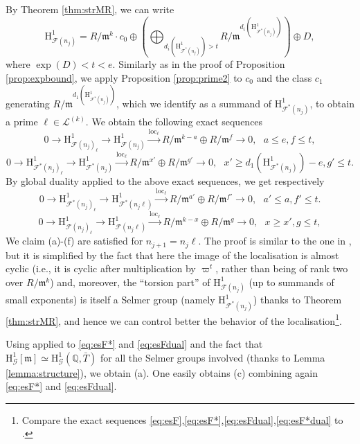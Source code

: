 \documentclass[10pt,reqno]{amsart}
\numberwithin{equation}{section}
\theoremstyle{plain}
\theoremstyle{definition}
\theoremstyle{definition}
\theoremstyle{plain}
\theoremstyle{plain}
\theoremstyle{plain}
\theoremstyle{plain}
\theoremstyle{plain}
\theoremstyle{plain}
\newcommand{\Q}{\mathbb{Q}}
\DeclareMathOperator{\loc}{loc}
\newcommand{\Fcal}{\mathcal{F}}
\newcommand{\cL}{\mathcal{L}}
\newcommand{\fm}{\mathfrak{m}}
\newcommand{\rH}{\mathrm{H}}
\begin{document}
By Theorem \ref{thm:strMR}, we can write
\[
\rH^1_{\Fcal(n_j)}= R/\fm^k\cdot c_0 \oplus \left(\bigoplus_{d_i(\rH^1_{\Fcal^*(n_j)})>t}R/\fm^{d_i(\rH^1_{\Fcal^*(n_j)})}\right) \oplus D,
\]
where $\exp(D)<t<e$.
Similarly as in the proof of Proposition \ref{prop:expbound}, we apply Proposition \ref{prop:prime2} to $c_0$ and the class $c_1$ generating $R/\fm^{d_1(\rH^1_{\Fcal^*(n_j)})}$, which we identify as a summand of $\rH^1_{\Fcal^*(n_j)}$, to obtain a prime $\ell\in \cL^{(k)}$. We obtain the following exact sequences
\begin{equation}\label{eq:esF}
0\to \rH^1_{\Fcal(n_j)_{\ell}}\to \rH^1_{\Fcal(n_j)} \xrightarrow{\loc_\ell} R/\fm^{k-a} \oplus R/\fm^f\to 0, \ \ \ a\leq e, f\leq t,
\end{equation}
\begin{equation}\label{eq:esF*}
0\to \rH^1_{\Fcal^*(n_j)_{\ell}}\to \rH^1_{\Fcal^*(n_j)} \xrightarrow{\loc_\ell} R/\fm^{x'}\oplus R/\fm^{g'} \to 0, \ \ \ x'\geq d_1(\rH^1_{\Fcal^*(n_j)})-e, g'\leq t.
\end{equation}
By global duality applied to the above exact sequences, we get respectively 
\begin{equation}\label{eq:esFdual}
0\to \rH^1_{\Fcal^*(n_j)_{\ell}} \to \rH^1_{\Fcal^*(n_j\ell)}\xrightarrow{\loc_\ell} R/\fm^{a'} \oplus R/\fm^{f'}\to 0, \ \ \ a'\leq a, f'\leq t.
\end{equation}
\begin{equation}\label{eq:esF*dual}
0\to \rH^1_{\Fcal(n_j)_\ell} \to \rH^1_{\Fcal(n_j\ell)} \xrightarrow{\loc_\ell} R/\fm^{k-x} \oplus R/\fm^{g}\to 0, \ \ \ x\geq x', g\leq t,
\end{equation}
We claim (a)-(f) are satisfied for $n_{j+1}=n_j\ell$. The proof is similar to the one in \cite[$\S$3.3.3]{eisenstein}, but it is simplified by the fact that here the image of the localisation is almost cyclic (i.e., it is cyclic after multiplication by $\varpi^t$, rather than being of rank two over $R/\fm^k$) and, moreover, the ``torsion part'' of $\rH^1_{\Fcal(n_j)}$ (up to summands of small exponents) is itself a Selmer group (namely $\rH^1_{\Fcal^*(n_j)}$) thanks to Theorem \ref{thm:strMR}, and hence we can control better the behavior of the localisation\footnote{Compare the exact sequences \eqref{eq:esF},\eqref{eq:esF*},\eqref{eq:esFdual},\eqref{eq:esF*dual} to \cite[(3.16),(3.17)]{eisenstein}.}.

Using \cite[Lem. 3.3.9]{eisenstein} applied to \eqref{eq:esF*} and \eqref{eq:esFdual} and the fact that $\rH^1_{\mathcal{G}}[\fm]\simeq \rH^1_{\mathcal{G}}(\Q,\bar{T})$ for all the Selmer groups involved (thanks to Lemma \ref{lemma:structure}), we obtain (a). One easily obtains (c) combining again \eqref{eq:esF*} and \eqref{eq:esFdual}. 
\end{document}
